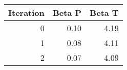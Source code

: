 \begin{tabular}{rrr}
\toprule
 Iteration &  Beta P &  Beta T \\
\midrule
         0 &    0.10 &    4.19 \\
         1 &    0.08 &    4.11 \\
         2 &    0.07 &    4.09 \\
\bottomrule
\end{tabular}
